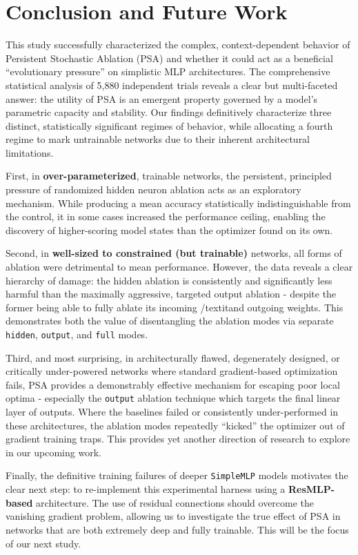 \documentclass[conference]{IEEEtran}
\begin{document}
\section{Conclusion and Future Work}

This study successfully characterized the complex, context-dependent behavior of Persistent Stochastic Ablation (PSA) and whether it could act as a beneficial ``evolutionary pressure'' on simplistic MLP architectures. The comprehensive statistical analysis of 5,880 independent trials reveals a clear but multi-faceted answer: the utility of PSA is an emergent property governed by a model's parametric capacity and stability. Our findings definitively characterize three distinct, statistically significant regimes of behavior, while allocating a fourth regime to mark untrainable networks due to their inherent architectural limitations.

First, in \textbf{over-parameterized}, trainable networks, the persistent, principled pressure of randomized hidden neuron ablation acts as an exploratory mechanism. While producing a mean accuracy statistically indistinguishable from the control, it in some cases increased the performance ceiling, enabling the discovery of higher-scoring model states than the optimizer found on its own.

Second, in \textbf{well-sized to constrained (but trainable)} networks, all forms of ablation were detrimental to mean performance. However, the data reveals a clear hierarchy of damage: the hidden ablation is consistently and significantly less harmful than the maximally aggressive, targeted output ablation - despite the former being able to fully ablate its incoming /textit{and} outgoing weights. This demonstrates both the value of disentangling the ablation modes via separate \verb|hidden|, \verb|output|, and \verb|full| modes.

Third, and most surprising, in architecturally flawed, degenerately designed, or critically under-powered networks where standard gradient-based optimization fails, PSA provides a demonstrably effective mechanism for escaping poor local optima - especially the \verb|output| ablation technique which targets the final linear layer of outputs. Where the baselines failed or consistently under-performed in these architectures, the ablation modes repeatedly ``kicked'' the optimizer out of gradient training traps. This provides yet another direction of research to explore in our upcoming work.

Finally, the definitive training failures of deeper \verb|SimpleMLP| models motivates the clear next step: to re-implement this experimental harness using a \textbf{ResMLP-based} architecture\cite{b9}. The use of residual connections should overcome the vanishing gradient problem, allowing us to investigate the true effect of PSA in networks that are both extremely deep and fully trainable. This will be the focus of our next study.
\end{document}
